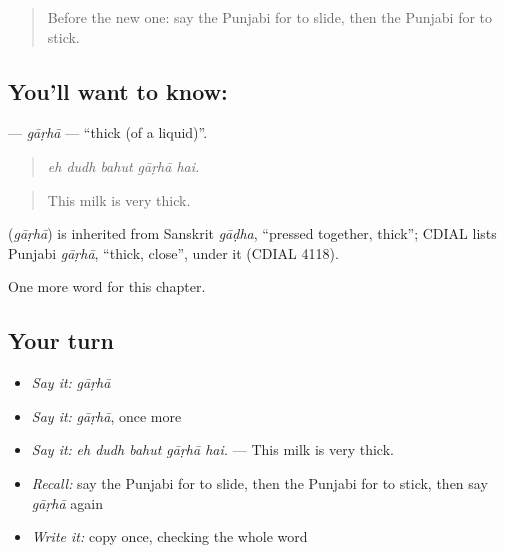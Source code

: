 \label{lesson:PA-C296-garha}



\begin{quote}
Before the new one: say the Punjabi for to slide, then the Punjabi for to stick.
\end{quote}

\subsection*{You'll want to know: }
\textbf{} — \emph{gāṛhā} — \textquotedblleft{}thick (of a liquid)\textquotedblright{}.

\begin{quote}
    
\end{quote}

\begin{quote}
\emph{eh dudh bahut gāṛhā hai.}
\end{quote}

\begin{quote}
This milk is very thick.
\end{quote}

\begin{cousinweb}
\textbf{} (\emph{gāṛhā}) is inherited from Sanskrit \emph{gāḍha}, \textquotedblleft{}pressed together, thick\textquotedblright{}; CDIAL lists Punjabi \emph{gāṛhā}, \textquotedblleft{}thick, close\textquotedblright{}, under it (CDIAL 4118).
\end{cousinweb}

\begin{grammarlens}[title={What you've built}]
One more word for this chapter.
\end{grammarlens}

\subsection*{Your turn}
\begin{itemize}
\raggedright
  \item \emph{Say it:} \emph{gāṛhā}
  \item \emph{Say it:} \emph{gāṛhā}, once more
  \item \emph{Say it:} \emph{eh dudh bahut gāṛhā hai.} — This milk is very thick.
  \item \emph{Recall:} say the Punjabi for to slide, then the Punjabi for to stick, then say \emph{gāṛhā} again
  \item \emph{Write it:} copy \textbf{} once, checking the whole word
\end{itemize}

